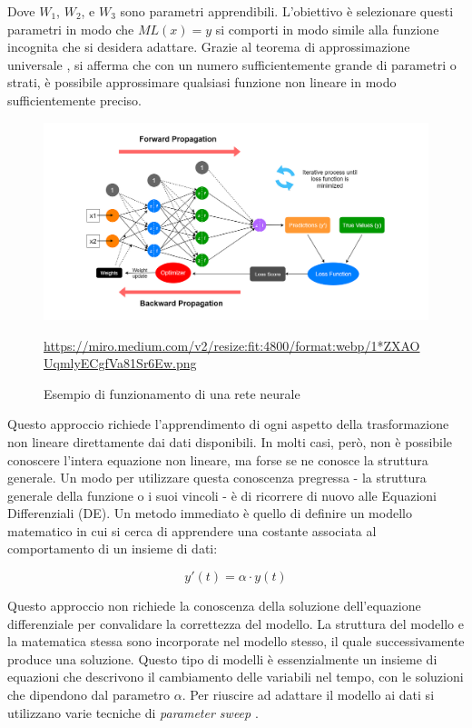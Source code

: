 Dove $W_1$, $W_2$, e $W_3$ sono parametri apprendibili. L'obiettivo è 
selezionare questi parametri in modo che $ML(x) = y$ si comporti in modo 
simile alla funzione incognita che si desidera adattare. Grazie 
al teorema di approssimazione universale \cite{nishijima2021universal}, si afferma 
che con un numero sufficientemente grande di parametri o strati, è 
possibile approssimare qualsiasi funzione non lineare in modo 
sufficientemente preciso.

\begin{figure}[H]
    \begin{center}
        \includegraphics[width=\textwidth]{img/1_ZXAOUqmlyECgfVa81Sr6Ew.png}
        \caption{Esempio di funzionamento di una rete neurale}
        \url{https://miro.medium.com/v2/resize:fit:4800/format:webp/1*ZXAOUqmlyECgfVa81Sr6Ew.png}
        \label{fig:NN_example}
    \end{center}
\end{figure}

Questo approccio richiede l'apprendimento di ogni aspetto della 
trasformazione non lineare direttamente dai dati disponibili. 
In molti casi, però, non è possibile conoscere l'intera equazione non 
lineare, ma forse se ne conosce la struttura generale. Un modo per utilizzare questa conoscenza pregressa - la struttura generale della funzione o i suoi vincoli - è di ricorrere di nuovo alle Equazioni Differenziali (DE).
Un metodo immediato è quello di definire un 
modello matematico in cui si cerca di apprendere una costante associata al 
comportamento di un insieme di dati:

$$y'(t) = \alpha \cdot y(t)$$

Questo approccio non richiede la conoscenza della soluzione dell'equazione 
differenziale per convalidare la correttezza del modello. La struttura del 
modello e la matematica stessa sono incorporate nel modello stesso, il 
quale successivamente produce una soluzione. Questo tipo di modelli è 
essenzialmente un insieme di equazioni che descrivono il cambiamento 
delle variabili nel tempo, con le soluzioni che dipendono dal parametro $\alpha$. Per riuscire ad adattare il modello ai dati si utilizzano varie tecniche di \emph{parameter sweep} \cite{FITZPATRICK201879}.

